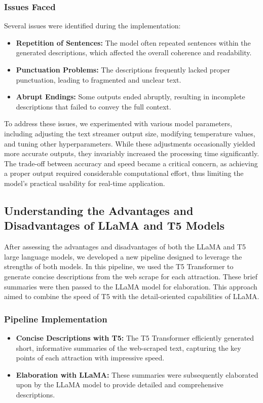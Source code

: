 \documentclass[conference]{IEEEtran}
\begin{document}
        \subsubsection{Issues Faced}
            Several issues were identified during the implementation:
            \begin{itemize}
                \item \textbf{Repetition of Sentences:} The model often repeated sentences within the generated descriptions, which affected the overall coherence and readability.
                \item \textbf{Punctuation Problems:} The descriptions frequently lacked proper punctuation, leading to fragmented and unclear text.
                \item \textbf{Abrupt Endings:} Some outputs ended abruptly, resulting in incomplete descriptions that failed to convey the full context.
            \end{itemize}
    
            To address these issues, we experimented with various model parameters, including adjusting the text streamer output size, modifying temperature values, and tuning other hyperparameters. While these adjustments occasionally yielded more accurate outputs, they invariably increased the processing time significantly. The trade-off between accuracy and speed became a critical concern, as achieving a proper output required considerable computational effort, thus limiting the model's practical usability for real-time application.
        
    \subsection{Understanding the Advantages and Disadvantages of LLaMA and T5 Models}
        
        After assessing the advantages and disadvantages of both the LLaMA and T5 large language models, we developed a new pipeline designed to leverage the strengths of both models. In this pipeline, we used the T5 Transformer to generate concise descriptions from the web scrape for each attraction. These brief summaries were then passed to the LLaMA model for elaboration. This approach aimed to combine the speed of T5 with the detail-oriented capabilities of LLaMA.
        
        \subsubsection{Pipeline Implementation}
            \begin{itemize}
                \item \textbf{Concise Descriptions with T5:} The T5 Transformer efficiently generated short, informative summaries of the web-scraped text, capturing the key points of each attraction with impressive speed.
                \item \textbf{Elaboration with LLaMA:} These summaries were subsequently elaborated upon by the LLaMA model to provide detailed and comprehensive descriptions.
            \end{itemize}
            
\end{document}
